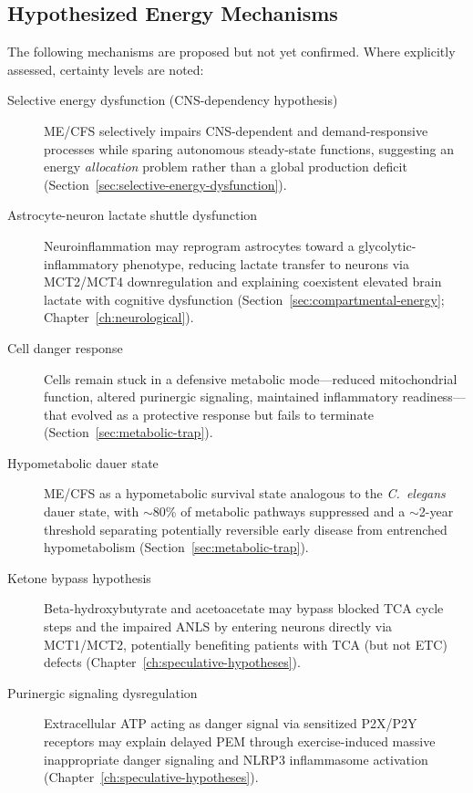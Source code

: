 \subsection{Hypothesized Energy Mechanisms}

The following mechanisms are proposed but not yet confirmed. Where explicitly assessed, certainty levels are noted:

\begin{description}
    \item[Selective energy dysfunction (CNS-dependency hypothesis)] ME/CFS selectively impairs CNS-dependent and demand-responsive processes while sparing autonomous steady-state functions, suggesting an energy \textit{allocation} problem rather than a global production deficit (Section~\ref{sec:selective-energy-dysfunction}).

    \item[Astrocyte-neuron lactate shuttle dysfunction ] Neuroinflammation may reprogram astrocytes toward a glycolytic-inflammatory phenotype, reducing lactate transfer to neurons via MCT2/MCT4 downregulation and explaining coexistent elevated brain lactate with cognitive dysfunction (Section~\ref{sec:compartmental-energy}; Chapter~\ref{ch:neurological}).

    \item[Cell danger response] Cells remain stuck in a defensive metabolic mode---reduced mitochondrial function, altered purinergic signaling, maintained inflammatory readiness---that evolved as a protective response but fails to terminate~\cite{Naviaux2014cdr} (Section~\ref{sec:metabolic-trap}).

    \item[Hypometabolic dauer state] ME/CFS as a hypometabolic survival state analogous to the \textit{C.~elegans} dauer state, with ${\sim}$80\% of metabolic pathways suppressed and a ${\sim}$2-year threshold separating potentially reversible early disease from entrenched hypometabolism (Section~\ref{sec:metabolic-trap}).

    \item[Ketone bypass hypothesis] Beta-hydroxybutyrate and acetoacetate may bypass blocked TCA cycle steps and the impaired ANLS by entering neurons directly via MCT1/MCT2, potentially benefiting patients with TCA (but not ETC) defects (Chapter~\ref{ch:speculative-hypotheses}).

    \item[Purinergic signaling dysregulation] Extracellular ATP acting as danger signal via sensitized P2X/P2Y receptors may explain delayed PEM through exercise-induced massive inappropriate danger signaling and NLRP3 inflammasome activation (Chapter~\ref{ch:speculative-hypotheses}).


\end{description}

